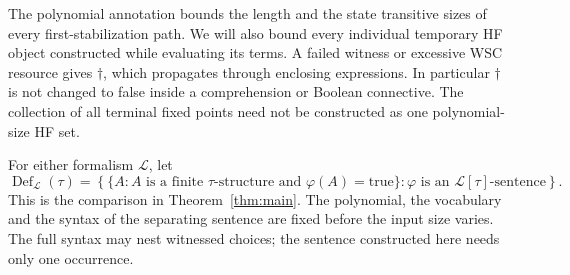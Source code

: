 The polynomial annotation bounds the length and the state transitive
sizes of every first-stabilization path. We will also bound every
individual temporary HF object constructed while evaluating its terms.
A failed witness or excessive WSC resource gives \(\dagger\), which
propagates through enclosing expressions. In particular \(\dagger\) is
not changed to false inside a comprehension or Boolean connective.
The collection of all terminal fixed points need not be constructed as
one polynomial-size HF set.

For either formalism \(\mathcal L\), let
\[
 \operatorname{Def}_{\mathcal L}(\tau)
 =\left\{\{A:A\text{ is a finite }\tau\text{-structure and }
                  \varphi(A)=\mathrm{true}\}:
                 \varphi\text{ is an }\mathcal L[\tau]\text{-sentence}\right\}.
\]
This is the comparison in Theorem~\ref{thm:main}. The polynomial, the
vocabulary and the syntax of the separating sentence are fixed before
the input size varies. The full syntax may nest witnessed choices; the
sentence constructed here needs only one occurrence.
